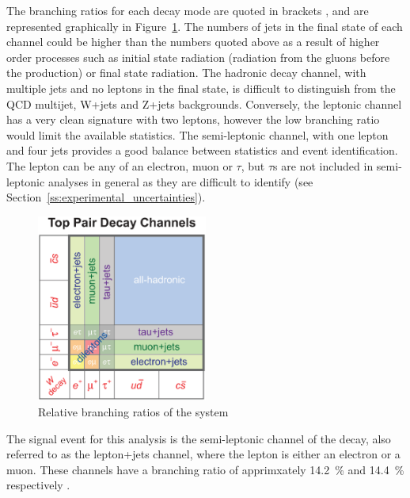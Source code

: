 The branching ratios for each decay mode are quoted in brackets \cite{Agashe:2014kda}, and are represented
graphically in Figure~\ref{fig:ttbar_branching_ratios}. The numbers of jets in the final state of each channel
could be higher than the numbers quoted above as a result of higher order processes such as initial state
radiation (radiation from the gluons before the \ttbar production) or final state radiation. The hadronic
decay channel, with multiple jets and no leptons in the final state, is difficult to distinguish from the QCD
multijet, W+jets and Z+jets backgrounds. Conversely, the leptonic channel has a very clean signature with two
leptons, however the low branching ratio would limit the available statistics. The semi-leptonic channel, with
one lepton and four jets provides a good balance between statistics and event identification. The lepton can
be any of an electron, muon or $\tau$, but $\tau$s are not included in semi-leptonic \tquark analyses in
general as they are difficult to identify (see Section~\ref{ss:experimental_uncertainties}).

\begin{figure}[hbtp]
   \centering
     \includegraphics[width=0.5\textwidth]{Chapters/03_Theory/Images/top_pair_decay_channels.eps}\hfill
     \caption{Relative branching ratios of the \ttbar system}
     \label{fig:ttbar_branching_ratios}
\end{figure}

The signal event for this analysis is the semi-leptonic channel of the \ttbar decay, also referred to as
the lepton+jets channel, where the lepton is either an electron or a muon. These channels have a branching
ratio of apprimxately 14.2~\% and 14.4~\% respectively \cite{Agashe:2014kda}.

